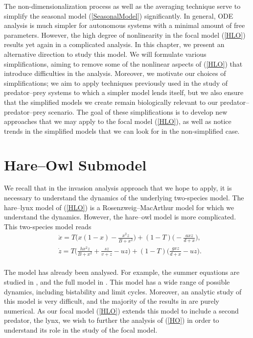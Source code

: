 \documentclass[12pt]{UOthesis}
\theoremstyle{remarkstyle}
\begin{document}
The non-dimensionalization process as well as the averaging technique serve to simplify the seasonal model (\ref{SeasonalModel}) significantly. In general, ODE analysis is much simpler for autonomous systems with a minimal amount of free parameters. However, the high degree of nonlinearity in the focal model (\ref{HLO}) results yet again in a complicated analysis. In this chapter, we present an alternative direction to study this model. We will formulate various simplifications, aiming to remove some of the nonlinear aspects of (\ref{HLO}) that introduce difficulties in the analysis. Moreover, we motivate our choices of simplifications; we aim to apply techniques previously used in the study of predator--prey systems to which a simpler model lends itself, but we also ensure that the simplified models we create remain biologically relevant to our predator--predator--prey scenario. The goal of these simplifications is to develop new approaches that we may apply to the focal model (\ref{HLO}), as well as notice trends in the simplified models that we can look for in the non-simplified case.

\section{Hare--Owl Submodel}
\label{SectionHOSubmodel}

We recall that in the invasion analysis approach that we hope to apply, it is necessary to understand the dynamics of the underlying two-species model. The hare--lynx model of (\ref{HLO}) is a Rosenzweig--MacArthur model for which we understand the dynamics. However, the hare--owl model is more complicated. This two-species model reads
\begin{equation}
	\begin{split}
		&\dot{x}=T\Big(x(1-x)-\frac{x^2 z}{B+x^2}\Big)+(1-T)\Big(-\frac{axz}{d+x}\Big),\\
		&\dot{z}=T\Big(\frac{hx^2z}{B+x^2}+\frac{sz}{v+z}-uz\Big)+(1-T)\Big(\frac{gxz}{d+x}-uz\Big).
	\end{split}
	\label{HO}
\end{equation}\\
The model has already been analysed. For example, the summer equations are studied in \cite{ErbachLutscherSeo}, and the full model in \cite{TysonLutscher}. This model has a wide range of possible dynamics, including bistability and limit cycles. Moreover, an analytic study of this model is very difficult, and the majority of the results in \cite{TysonLutscher} are purely numerical. As our focal model (\ref{HLO}) extends this model to include a second predator, the lynx, we wish to further the analysis of (\ref{HO}) in order to understand its role in the study of the focal model.\\
\end{document}
